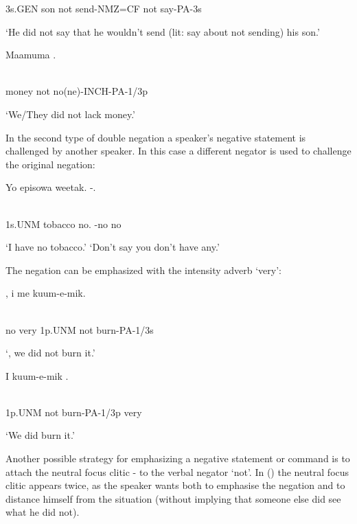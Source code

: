 3s.GEN  son  not  send-NMZ=CF  not  say-PA-3s

`He did not say that he wouldn't send (lit: say about not sending) his son.'

\ea%
\label{ex:x1132}
\gll Maamuma  . \\
      \\
\glt
\z

money  not  no(ne)-INCH-PA-1/3p

`We/They did not lack money.'

In the second type of double negation a speaker's negative statement is challenged by another speaker. In this case a different negator is used to challenge the original negation: 

\ea%
\label{ex:x1133}
\gll Yo  episowa  weetak.  -. \\
      \\
\glt
\z

1s.UNM  tobacco  no.  -no  no

`I have no tobacco.'  `Don't say you don't have any.'

The negation can be emphasized with the intensity adverb  `very':

\ea%
\label{ex:x1134}
\gll {},  i  me  kuum-e-mik. \\
      \\
\glt
\z

no  very  1p.UNM  not  burn-PA-1/3s

`, we did not burn it.'

\ea%
\label{ex:x1135}
\gll I    kuum-e-mik  . \\
      \\
\glt
\z

1p.UNM  not  burn-PA-1/3p  very

`We did  burn it.'

Another possible strategy for emphasizing a negative statement or command is to attach the neutral focus clitic - to the verbal negator  `not'. In () the neutral focus clitic appears twice, as the speaker wants both to emphasise the negation and to distance himself from the situation (without implying that someone else did see what he did not). 

